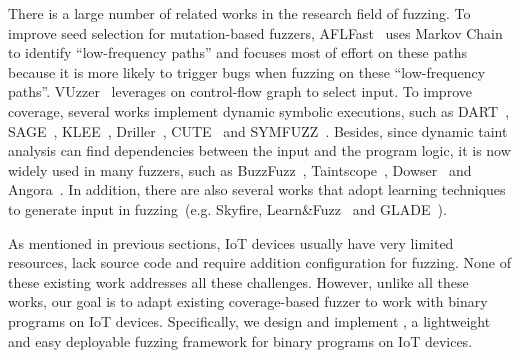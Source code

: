 There is a large number of related works in the research field of fuzzing. To improve seed selection for mutation-based fuzzers, AFLFast~\cite{bohme2017coverage} uses Markov Chain to identify ``low-frequency paths'' and focuses most of effort on these paths because it is more likely to trigger bugs when fuzzing on these ``low-frequency paths''. VUzzer~\cite{rawat2017vuzzer} leverages on control-flow graph to select input. To improve coverage, several works implement dynamic symbolic executions, such as DART~\cite{godefroid2005dart}, SAGE~\cite{godefroid2012sage}, KLEE~\cite{cadar2008klee}, Driller~\cite{stephens2016driller}, CUTE~\cite{sen2005cute} and SYMFUZZ~\cite{cha2015program}. Besides, since dynamic taint analysis can find dependencies between the input and the program logic, it is now widely used in many fuzzers, such as BuzzFuzz~\cite{ganesh2009taint}, Taintscope~\cite{wang2010taintscope}, Dowser~\cite{haller2013dowsing} and Angora~\cite{chen2018angora}. In addition, there are also several works that adopt learning techniques to generate input in fuzzing~(e.g. Skyfire\cite{wang2017skyfire}, Learn\&Fuzz~\cite{godefroid2017learn} and GLADE~\cite{bastani2017synthesizing}).  

As mentioned in previous sections, IoT devices usually have very limited resources, lack source code and require addition configuration for fuzzing. None of these existing work addresses all these challenges. However, unlike all these works, our goal is to adapt existing coverage-based fuzzer to work with binary programs on IoT devices. Specifically, we design and implement \sysname, a lightweight and easy deployable fuzzing framework for binary programs on IoT devices.